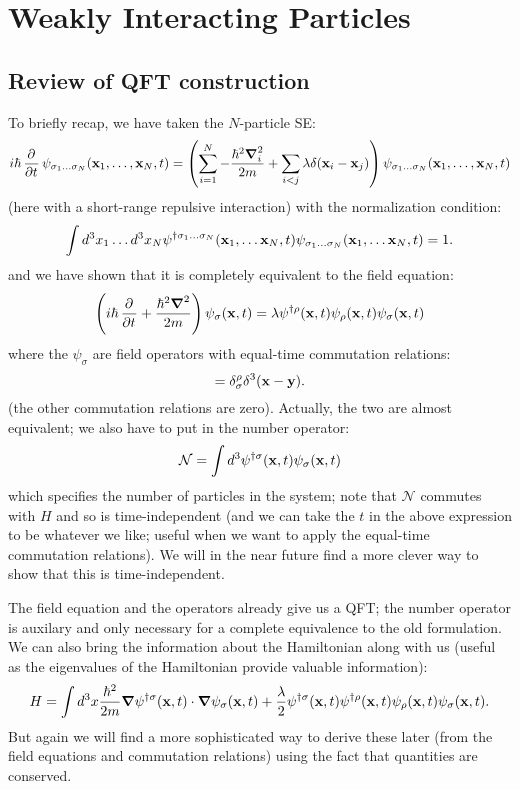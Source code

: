 \section{Weakly Interacting Particles}
\subsection{Review of QFT construction}
To briefly recap, we have taken the $N$-particle SE:
\begin{equation}
    i\hbar\dpd{}{t}\psi_{\sigma_1\ldots\sigma_N}(\v{x}_1, \ldots, \v{x}_N, t) = \left(\sum_{i=1}^N -\frac{\hbar^2\nabla^2_i}{2m} + \sum_{i < j}\lambda\delta(\v{x}_i - \v{x}_j)\right)\psi_{\sigma_1\ldots\sigma_N}(\v{x}_1, \ldots, \v{x}_N, t)
\end{equation}
(here with a short-range repulsive interaction) with the normalization condition:
\begin{equation}
    \int d^3x_1\ldots d^3x_N \psi^{\dagger\sigma_1\ldots\sigma_N}(\mathbf{x}_1, \ldots \mathbf{x}_N, t)\psi_{\sigma_1\ldots\sigma_N}(\mathbf{x}_1, \ldots \mathbf{x}_N, t) = 1.
\end{equation}
and we have shown that it is completely equivalent to the field equation:
\begin{equation}
    \left(i\hbar\dpd{}{t} + \frac{\hbar^2\nabla^2}{2m}\right)\psi_{\sigma}(\v{x}, t) = \lambda\psi^{\dag\rho}(\v{x}, t)\psi_\rho(\v{x}, t)\psi_\sigma(\v{x}, t)
\end{equation}
where the $\psi_\sigma$ are field operators with equal-time commutation relations:
\begin{equation}
    [\psi_\sigma(\v{x}, t), \psi^{\dag\rho}(\v{y}, t)] = \delta_\sigma^\rho \delta^3(\v{x} - \v{y}).
\end{equation}
(the other commutation relations are zero). Actually, the two are almost equivalent; we also have to put in the number operator:
\begin{equation}
    \mathcal{N} = \int d^3 \psi^{\dagger\sigma}(\mathbf{x}, t)\psi_\sigma(\mathbf{x}, t)
\end{equation}
which specifies the number of particles in the system; note that $\mathcal{N}$ commutes with $H$ and so is time-independent (and we can take the $t$ in the above expression to be whatever we like; useful when we want to apply the equal-time commutation relations). We will in the near future find a more clever way to show that this is time-independent. 

The field equation and the operators already give us a QFT; the number operator is auxilary and only necessary for a complete equivalence to the old formulation. We can also bring the information about the Hamiltonian along with us (useful as the eigenvalues of the Hamiltonian provide valuable information):
\begin{equation}
    H = \int d^3x \frac{\hbar^2}{2m}\nabla\psi^{\dag\sigma}(\v{x}, t)\cdot \nabla \psi_\sigma(\v{x}, t) + \frac{\lambda}{2}\psi^{\dag\sigma}(\v{x}, t)\psi^{\dag\rho}(\v{x}, t)\psi_\rho(\v{x}, t)\psi_\sigma(\v{x}, t).
\end{equation}
But again we will find a more sophisticated way to derive these later (from the field equations and commutation relations) using the fact that quantities are conserved.


